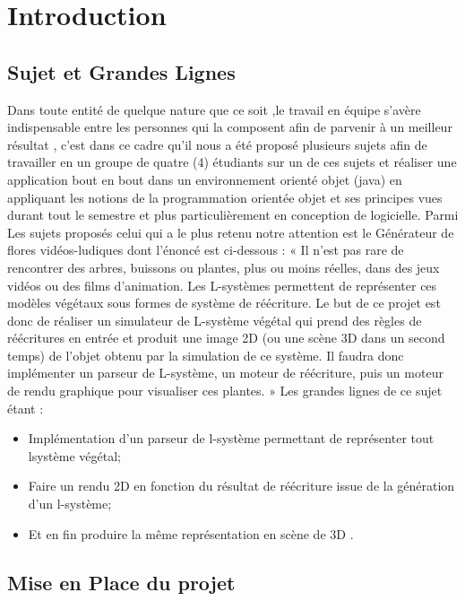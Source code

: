 \chapter{Introduction}
\section{Sujet et Grandes Lignes}
	Dans toute entité de quelque nature que ce soit ,le travail en équipe s’avère
indispensable entre les personnes qui la composent afin de parvenir à un
meilleur résultat , c’est dans ce cadre qu’il nous a été proposé plusieurs sujets
afin de travailler en un groupe de quatre (4) étudiants sur un de ces sujets et
réaliser une application bout en bout dans un environnement orienté objet
(java) en appliquant les notions de la programmation orientée objet et ses
principes vues durant tout le semestre et plus particulièrement en conception
de logicielle.
\vspace{0.2cm}
Parmi Les sujets proposés celui qui a le plus retenu notre attention est le
Générateur de flores vidéos-ludiques dont l’énoncé est ci-dessous :
\vspace{0.2cm}
« Il n’est pas rare de rencontrer des arbres, buissons ou plantes, plus ou
moins réelles, dans des jeux vidéos ou des films d’animation. Les L-systèmes
permettent de représenter ces modèles végétaux sous formes de système de
réécriture. Le but de ce projet est donc de réaliser un simulateur de L-système
végétal qui prend des règles de réécritures en entrée et produit une image 2D
(ou une scène 3D dans un second temps) de l’objet obtenu par la simulation de ce système. Il faudra donc implémenter un parseur de L-système, un
moteur de réécriture, puis un moteur de rendu graphique pour visualiser ces
plantes. »
Les grandes lignes de ce sujet étant :
\vspace{0.2cm}
\begin{itemize}
	\item Implémentation d’un parseur de l-système permettant de représenter
tout lsystème végétal;
	\item  Faire un rendu 2D en fonction du résultat de réécriture issue de la
génération d’un l-système;
	\item  Et en fin produire la même représentation en scène de 3D .
\end{itemize}

\newpage
\section{Mise en Place du projet}

